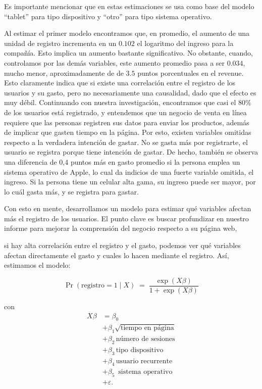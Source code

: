 \documentclass[conference]{IEEEtran}
\begin{document}
Es importante mencionar que en estas estimaciones se usa como base del modelo “tablet” para tipo dispositivo 
y “otro” para tipo sistema operativo.
 
Al estimar el primer modelo encontramos que, en promedio, el aumento de una unidad de registro incrementa en un $0.102$
 el logaritmo del ingreso para la compañía. Esto implica un aumento bastante significativo. No obstante, cuando, controlamos por las demás variables, este aumento promedio pasa a ser $0.034$, mucho menor, aproximadamente de de  $3.5$ puntos porcentuales en el revenue. Esto claramente indica que si existe una correlación entre el registro de los usuarios y su gasto, pero no necesariamente una causalidad, dado que el efecto es muy débil. Continuando con nuestra investigación, encontramos que casi el $80\%$ de los usuarios está registrado, y entendemos que un negocio de venta en línea requiere que las personas registren sus datos para enviar los productos, 
 además de implicar que gasten tiempo en la página. Por esto, existen variables omitidas respecto a la verdadera intención de gastar. No se gasta más por registrarte, el usuario se registra porque tiene intención de gastar. De hecho, también se observa una diferencia de 0,4 puntos más en gasto promedio si la persona emplea un sistema operativo de Apple, lo cual da indicios de una fuerte variable omitida, el ingreso. Si la persona tiene un celular alta gama, su ingreso puede ser mayor, por lo cuál gasta más, y se registra para gastar.

 Con esto en mente, desarrollamos un modelo para estimar qué variables afectan más el registro de los usuarios. El punto clave es buscar profundizar en nuestro informe para mejorar la comprensión del negocio respecto a su página web,
 
 si hay alta correlación entre el registro y el gasto, podemos ver qué variables afectan directamente el gasto y cuales lo hacen mediante el registro. Así, estimamos el modelo: 


\[
\Pr(\text{registro} = 1 \mid X) \;=\; \frac{\exp(X\beta)}{1 + \exp(X\beta)}
\]

con
\begin{align*}
    X\beta & = \beta_0 \\
    & + \beta_1 \sqrt{\text{tiempo en página}} \\
    & + \beta_2 \,\text{número de sesiones} \\
    & + \beta_3 \,\text{tipo dispositivo} \\
    & + \beta_4 \,\text{usuario recurrente} \\
    & + \beta_5 \,\text{ sistema operativo} \\
    & + \varepsilon.
\end{align*}
\end{document}
